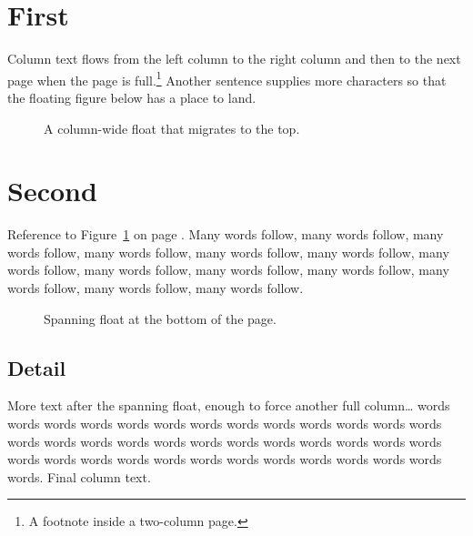\documentclass[twocolumn]{article}
\begin{document}
\section{First}
Column text flows from the left column to the right column and then to the next page when the page is full.\footnote{A footnote inside a two-column page.}
Another sentence supplies more characters so that the floating figure below has a place to land.
\begin{figure}[t]
\centering{}
\caption{A column-wide float that migrates to the top.}\label{f1}
\end{figure}
\section{Second}
Reference to Figure~\ref{f1} on page \pageref{f1}. Many words follow, many words follow, many words follow, many words follow, many words follow, many words follow, many words follow, many words follow, many words follow, many words follow, many words follow, many words follow, many words follow.
\begin{figure}[b]
\centering{}
\caption{Spanning float at the bottom of the page.}
\end{figure}
\subsection{Detail}
More text after the spanning float, enough to force another full column\ldots{} words words words words words words words words words words words words words words words words words words words words words words words words words words words words words words words words words words words words words words.
\vfill\newpage Final column text.
\end{document}
